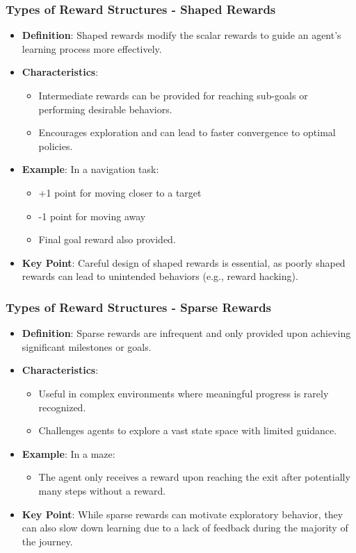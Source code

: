 \documentclass[aspectratio=169]{beamer}
\begin{document}
\begin{frame}[fragile]
    \frametitle{Types of Reward Structures - Shaped Rewards}
    \begin{itemize}
        \item \textbf{Definition}: Shaped rewards modify the scalar rewards to guide an agent's learning process more effectively.
        \item \textbf{Characteristics}:
        \begin{itemize}
            \item Intermediate rewards can be provided for reaching sub-goals or performing desirable behaviors.
            \item Encourages exploration and can lead to faster convergence to optimal policies.
        \end{itemize}
        \item \textbf{Example}: In a navigation task:
        \begin{itemize}
            \item +1 point for moving closer to a target 
            \item -1 point for moving away 
            \item Final goal reward also provided.
        \end{itemize}
        \item \textbf{Key Point}: Careful design of shaped rewards is essential, as poorly shaped rewards can lead to unintended behaviors (e.g., reward hacking).
    \end{itemize}
\end{frame}

\begin{frame}[fragile]
    \frametitle{Types of Reward Structures - Sparse Rewards}
    \begin{itemize}
        \item \textbf{Definition}: Sparse rewards are infrequent and only provided upon achieving significant milestones or goals.
        \item \textbf{Characteristics}:
        \begin{itemize}
            \item Useful in complex environments where meaningful progress is rarely recognized.
            \item Challenges agents to explore a vast state space with limited guidance.
        \end{itemize}
        \item \textbf{Example}: In a maze:
        \begin{itemize}
            \item The agent only receives a reward upon reaching the exit after potentially many steps without a reward.
        \end{itemize}
        \item \textbf{Key Point}: While sparse rewards can motivate exploratory behavior, they can also slow down learning due to a lack of feedback during the majority of the journey.
    \end{itemize}
\end{frame}
\end{document}
